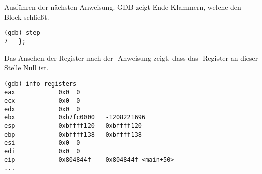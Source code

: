 Ausführen der nächsten Anweisung.
\ac{GDB} zeigt Ende-Klammern, welche den Block schließt.

\begin{lstlisting}
(gdb) step
7	};
\end{lstlisting}

Das Ansehen der Register nach der -Anweisung zeigt. dass
das \EAX-Register an dieser Stelle Null ist.

\begin{lstlisting}
(gdb) info registers
eax            0x0	0
ecx            0x0	0
edx            0x0	0
ebx            0xb7fc0000	-1208221696
esp            0xbffff120	0xbffff120
ebp            0xbffff138	0xbffff138
esi            0x0	0
edi            0x0	0
eip            0x804844f	0x804844f <main+50>
...
\end{lstlisting}
